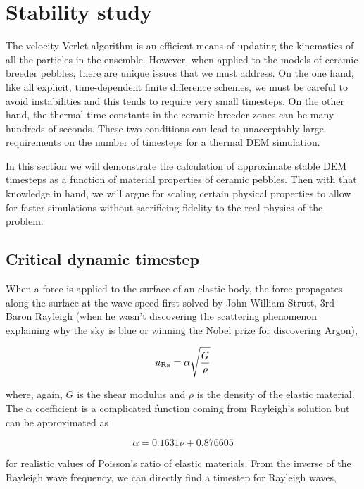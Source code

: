 \section{Stability study}
The velocity-Verlet algorithm is an efficient means of updating the kinematics of all the particles in the ensemble. However, when applied to the models of ceramic breeder pebbles, there are unique issues that we must address. On the one hand, like all explicit, time-dependent finite difference schemes, we must be careful to avoid instabilities and this tends to require very small timesteps. On the other hand, the thermal time-constants in the ceramic breeder zones can be many hundreds of seconds. These two conditions can lead to unacceptably large requirements on the number of timesteps for a thermal DEM simulation.

In this section we will demonstrate the calculation of approximate stable DEM timesteps as a function of material properties of ceramic pebbles. Then with that knowledge in hand, we will argue for scaling certain physical properties to allow for faster simulations without sacrificing fidelity to the real physics of the problem.


\subsection{Critical dynamic timestep}
When a force is applied to the surface of an elastic body, the force propagates along the surface at the wave speed first solved by John William Strutt, 3rd Baron Rayleigh\cite{Rayleigh1885} (when he wasn't discovering the scattering phenomenon explaining why the sky is blue or winning the Nobel prize for discovering Argon),

\begin{equation}
	u_{\mathrm{Ra}} = \alpha\sqrt{\frac{G}{\rho}}
\end{equation}

where, again, $G$ is the shear modulus and $\rho$ is the density of the elastic material. The $\alpha$ coefficient is a complicated function coming from Rayleigh's solution but can be approximated as\cite{Sheng2004}

\begin{equation}
	\alpha = 0.1631 \nu + 0.876605
\end{equation}

for realistic values of Poisson's ratio of elastic materials. From the inverse of the Rayleigh wave frequency, we can directly find a timestep for Rayleigh waves,

